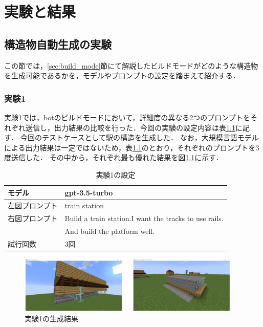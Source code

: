 \chapter{実験と結果}	
\thispagestyle{plain}   %

\section{構造物自動生成の実験}\label{sec:build_mode_generate}
この節では，\ref{sec:build_mode}節にて解説したビルドモードがどのような構造物を生成可能であるかを，モデルやプロンプトの設定を踏まえて紹介する．

\subsection{実験1}\label{sec:ex1}
実験1では，botのビルドモードにおいて，詳細度の異なる2つのプロンプトをそれぞれ送信し，出力結果の比較を行った．今回の実験の設定内容は表\ref{tab:setting1}に記す．
今回のテストケースとして駅の構造を生成した．
なお，大規模言語モデルによる出力結果は一定ではないため，表\ref{tab:setting1}のとおり，それぞれのプロンプトを3度送信した．
その中から，それぞれ最も優れた結果を図\ref{fig:station1}に示す．
\begin{table}[H]
    \caption{実験1の設定}\label{tab:setting1}
    \centering
    \begin{tabular}{ll}
        \hline \hline
        モデル & gpt-3.5-turbo \\
        \hline
        左図プロンプト & train station \\
        \hline
        右図プロンプト & Build a train station.I want the tracks to use rails. \\
        　 & And build the platform well. \\
        \hline
        試行回数 & 3回 \\
        \hline
    \end{tabular}
\end{table}

\begin{figure}[H]
    \centering
    \includegraphics[width=0.95\textwidth]{fig/train_station1.PNG}
    \caption{実験1の生成結果}
    \label{fig:station1}
\end{figure}

